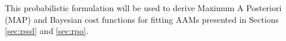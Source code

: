 This probabilistic formulation will be used to derive Maximum A Posteriori (MAP) and Bayesian cost functions for fitting AAMs presented in Sections \ref{sec:rssd} and \ref{sec:rpo}.

